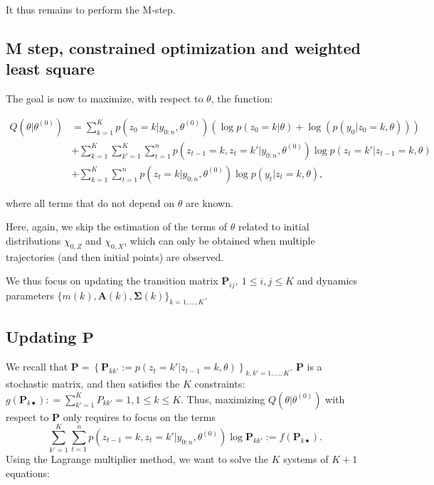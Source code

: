 \documentclass[]{book}
\begin{document}
It thus remains to perform the M-step.

\subsection{M step, constrained optimization and weighted least
square}\label{m-step-constrained-optimization-and-weighted-least-square}

The goal is now to maximize, with respect to \(\theta\), the function:

\begin{align*}
Q(\theta \vert \theta^{(0)})&= \sum_{k = 1}^K p(z_0 = k \vert y_{0:n}, \theta^{(0)})\left(\log p(z_0 = k \vert \theta) + \log(p(y_0 \vert z_0 = k, \theta))\right)  \nonumber \\
& + \sum_{k = 1}^K\sum_{k' = 1}^K \sum_{t = 1}^n p(z_{t-1} = k, z_{t} = k'\vert y_{0:n}, \theta^{(0)}) \log p(z_{t} = k' \vert z_{t - 1} = k,\theta) \nonumber \\
& + \sum_{k = 1}^K \sum_{t = 1}^n p(z_t = k\vert y_{0:n}, \theta^{(0)}) \log p(y_{t} \vert z_{t} = k, \theta), \nonumber
\end{align*}

where all terms that do not depend on \(\theta\) are known.

Here, again, we skip the estimation of the terms of \(\theta\) related
to initial distributions \(\chi_{0,Z}\) and \(\chi_{0, X}\), which can
only be obtained when multiple trajectories (and then initial points)
are observed.

We thus focus on updating the transition matrix
\(\mathbf{P}_{ij},~1\leq i, j \leq K\) and dynamics parameters
\(\lbrace m(k), \mathbf{A}(k), \mathbf{\Sigma}(k)\rbrace_{k = 1,\dots, K}\).

\subsection*{\texorpdfstring{Updating
\(\mathbf{P}\)}{Updating \textbackslash{}mathbf\{P\}}}\label{updating-mathbfp}

We recall that
\(\mathbf{P} = \left \lbrace\mathbf{P}_{kk'} := p(z_{t} = k' \vert z_{t - 1} = k, \theta) \right\rbrace_{k,k' = 1,\dots, K}\).
\(\mathbf{P}\) is a stochastic matrix, and then satisfies the \(K\)
constraints:
\(g(\mathbf{P}_{k\bullet}): = \sum_{k'=1}^K P_{kk'} = 1, 1\leq k \leq K\).
Thus, maximizing \(Q(\theta \vert \theta^{(0)})\) with respect to
\(\mathbf{P}\) only requires to focus on the terms
\[\sum_{k' = 1}^K \sum_{t = 1}^ np(z_{t-1} = k, z_{t} = k'\vert y_{0:n}, \theta^{(0)}) \log \mathbf{P}_{kk'} := f(\mathbf{P}_{k\bullet}).\]
Using the Lagrange multiplier method, we want to solve the \(K\) systems
of \(K + 1\) equations:
\end{document}
